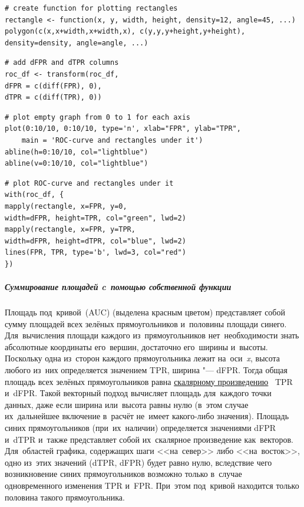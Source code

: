\documentclass[]{scrreprt}
\begin{document}
%
\begin{lstlisting}[float, caption = Создание функции \textbf{rectangle}, firstnumber=1, label= lst:create-rectangle-function-r]
# create function for plotting rectangles
rectangle <- function(x, y, width, height, density=12, angle=45, ...) 
polygon(c(x,x+width,x+width,x), c(y,y,y+height,y+height), 
density=density, angle=angle, ...)
\end{lstlisting}
%
\begin{lstlisting}[float, caption = Добавление столбцов dFPR и~dTPR, firstnumber=1, label= lst:add-dFPR&dTPR-columns-r]
# add dFPR and dTPR columns
roc_df <- transform(roc_df, 
dFPR = c(diff(FPR), 0),
dTPR = c(diff(TPR), 0))
\end{lstlisting}
%
\begin{lstlisting}[float, caption = Построение пустого графа и~разметка осей от~0 до~1, firstnumber=1, label= lst:plot-empty-graph-from-0-to-1-r]
# plot empty graph from 0 to 1 for each axis
plot(0:10/10, 0:10/10, type='n', xlab="FPR", ylab="TPR",
	main = 'ROC-curve and rectangles under it')
abline(h=0:10/10, col="lightblue")
abline(v=0:10/10, col="lightblue")
\end{lstlisting}
%
\begin{lstlisting}[float, caption = Построение ROC-кривой и~прямоугольников под~ней, firstnumber=1, label= lst:plot-ROC-curve-and-rectangles-under-it-r]
# plot ROC-curve and rectangles under it
with(roc_df, {
mapply(rectangle, x=FPR, y=0,   
width=dFPR, height=TPR, col="green", lwd=2)
mapply(rectangle, x=FPR, y=TPR, 
width=dFPR, height=dTPR, col="blue", lwd=2)
lines(FPR, TPR, type='b', lwd=3, col="red")
})
\end{lstlisting}
%

\subparagraph{Суммирование площадей c~помощью собственной функции}
Площадь под~кривой~(AUC) (выделена красным цветом) представляет собой сумму площадей всех зелёных прямоугольников и~половины площади синего. Для~вычисления площади каждого из~прямоугольников нет~необходимости знать абсолютные координаты его~вершин, достаточно его~ширины и~высоты. Поскольку одна из~сторон каждого прямоугольника лежит на~оси~\textit{x}, высота любого из~них определяется значением TPR, ширина "--- dFPR. Тогда общая площадь всех зелёных прямоугольников равна \href{https://en.wikipedia.org/wiki/Dot_product}{скалярному произведению}~\cite{Wiki:Dot-product} TPR и~dFPR. Такой векторный подход вычисляет площадь для~каждого точки данных, даже если ширина или~высота равны нулю (в~этом случае их~дальнейшее включение в~расчёт не~имеет какого-либо значения). Площадь синих прямоугольников (при~их~наличии) определяется значениями dFPR и~dTPR и~также представляет собой их~скалярное произведение как~векторов. Для~областей графика, содержащих шаги <<на~север>> либо <<на~восток>>, одно из~этих значений (dTPR, dFPR) будет равно нулю, вследствие чего возникновение синих прямоугольников возможно только в~случае одновременного изменения TPR и~FPR. При~этом под~кривой находится только половина такого прямоугольника.
\end{document}
